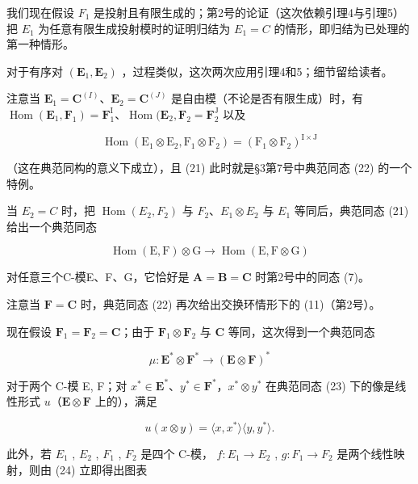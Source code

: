 我们现在假设 \(F_{1}\) 是投射且有限生成的；第2号的论证（这次依赖引理4与引理5）把 \(E_{1}\) 为任意有限生成投射模时的证明归结为 \(E_{1} = C\) 的情形，即归结为已处理的第一种情形。

对于有序对 \((\mathbf{E}_{1}, \mathbf{E}_{2})\) ，过程类似，这次两次应用引理4和5；细节留给读者。

注意当 \(\mathbf{E}_1 = \mathbf{C}^{(I)}\)、\(\mathbf{E}_2 = \mathbf{C}^{(J)}\) 是自由模（不论是否有限生成）时，有 \(\operatorname{Hom}(\mathbf{E}_1, \mathbf{F}_1) = \mathbf{F}_1^{\mathrm{I}}\)、\(\operatorname{Hom}(\mathbf{E}_2, \mathbf{F}_2 = \mathbf{F}_2^{\mathrm{J}}\) 以及

\[
\operatorname{Hom} \left(\mathrm{E} _ {1} \otimes \mathrm{E} _ {2}, \mathrm{F} _ {1} \otimes \mathrm{F} _ {2}\right) = \left(\mathrm{F} _ {1} \otimes \mathrm{F} _ {2}\right) ^ {\mathrm{I} \times \mathrm{J}}
\]

（这在典范同构的意义下成立），且 (21) 此时就是§3第7号中典范同态 (22) 的一个特例。

当 \(E_{2} = C\) 时，把 \(\operatorname{Hom}(E_{2}, F_{2})\) 与 \(F_{2}\)、\(E_{1} \otimes E_{2}\) 与 \(E_{1}\) 等同后，典范同态 (21) 给出一个典范同态

\[
\operatorname{Hom} (\mathrm{E}, \mathrm{F}) \otimes \mathrm{G} \rightarrow \operatorname{Hom} (\mathrm{E}, \mathrm{F} \otimes \mathrm{G})\tag{22}
\]

对任意三个C-模E、F、G，它恰好是 \(\mathbf{A} = \mathbf{B} = \mathbf{C}\) 时第2号中的同态 (7)。

注意当 \(\mathbf{F} = \mathbf{C}\) 时，典范同态 (22) 再次给出交换环情形下的 (11)（第2号）。

现在假设 \(\mathbf{F}_1 = \mathbf{F}_2 = \mathbf{C}\)；由于 \(\mathbf{F}_1 \otimes \mathbf{F}_2\) 与 \(\mathbf{C}\) 等同，这次得到一个典范同态

\[
\mu : \mathbf {E} ^ {*} \otimes \mathbf {F} ^ {*} \rightarrow (\mathbf {E} \otimes \mathbf {F}) ^ {*}\tag{23}
\]

对于两个 C-模 E, F；对 \(x^{*} \in \mathbf{E}^{*}\)、\(y^{*} \in \mathbf{F}^{*}\)，\(x^{*} \otimes y^{*}\) 在典范同态 (23) 下的像是线性形式 \(u\)（\(\mathbf{E} \otimes \mathbf{F}\) 上的），满足

\[
u (x \otimes y) = \langle x, x ^ {*} \rangle \langle y, y ^ {*} \rangle .\tag{24}
\]

此外，若 \(E_{1}\) , \(E_{2}\) , \(F_{1}\) , \(F_{2}\) 是四个 C-模， \(f: E_{1} \rightarrow E_{2}\) , \(g: F_{1} \rightarrow F_{2}\) 是两个线性映射，则由 (24) 立即得出图表

